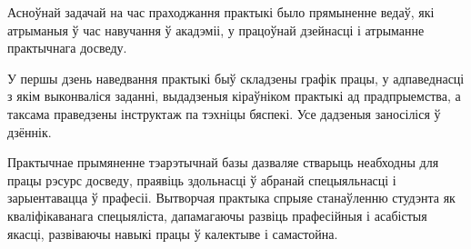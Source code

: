
Асноўнай задачай на час праходжання практыкі было прямыненне ведаў, які атрыманыя ў час навучання ў акадэміі,
у працоўнай дзейнасці і атрыманне практычнага досведу.

У першы дзень наведвання практыкі быў складзены графік працы, у адпаведнасці з якім выконваліся заданні, выдадзеныя кіраўніком практыкі ад прадпрыемства, а таксама праведзены інструктаж па тэхніцы бяспекі. Усе дадзеныя заносіліся ў дзённік.

Практычнае прымяненне тэарэтычнай базы дазваляе стварыць неабходны для працы рэсурс досведу, праявіць здольнасці ў абранай спецыяльнасці і зарыентавацца ў прафесіі. Вытворчая практыка спрыяе станаўленню студэнта як кваліфікаванага спецыяліста, дапамагаючы развіць прафесійныя і асабістыя якасці, развіваючы навыкі працы ў калектыве і самастойна.
